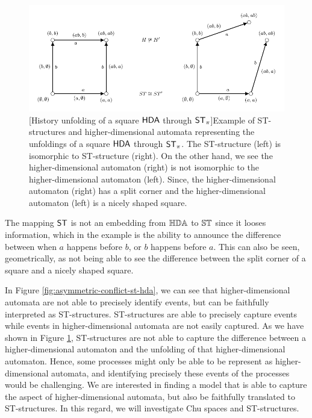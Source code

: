     \begin{figure}[ht]
        \centering
        \includegraphics[scale=0.9]{Figures/4.Relationship-with-other-models-of-concurrency/ST-structure-and-HDA/HDA-collapse.pdf}
        [History unfolding of a square $\text{\textup{\textsf{HDA}}}$ through $\mathsf{ST}_{\pi}$]{Example of ST-structures and higher-dimensional automata representing the unfoldings of a square $\text{\textup{\textsf{HDA}}}$ through $\mathsf{ST}_{\pi}$. The ST-structure (left) is isomorphic to ST-structure (right). On the other hand, we see the higher-dimensional automaton (right) is not isomorphic to the higher-dimensional automaton (left). Since, the higher-dimensional automaton (right) has a split corner and the higher-dimensional automaton (left) is a nicely shaped square.}
        \label{fig:Unfolding-HDA}
    \end{figure}
    
    The mapping $\mathsf{ST}$ is not an embedding from $\mathbb{HDA}$ to $\mathbb{ST}$ since it looses information, which in the example is the ability to announce the difference between when $a$ happens before $b$, or $b$ happens before $a$. This can also be seen, geometrically, as not being able to see the difference between the split corner of a square and a nicely shaped square.

    In Figure \ref{fig:asymmetric-conflict-st-hda}, we can see that higher-dimensional automata are not able to precisely identify events, but can be faithfully interpreted as ST-structures. ST-structures are able to precisely capture events while events in higher-dimensional automata are not easily captured. As we have shown in Figure \ref{fig:Unfolding-HDA}, ST-structures are not able to capture the difference between a higher-dimensional automaton and the unfolding of that higher-dimensional automaton. Hence, some processes might only be able to be represent as higher-dimensional automata, and identifying precisely these events of the processes would be challenging. We are interested in finding a model that is able to capture the aspect of higher-dimensional automata, but also be faithfully translated to ST-structures. In this regard, we will investigate Chu spaces and ST-structures.